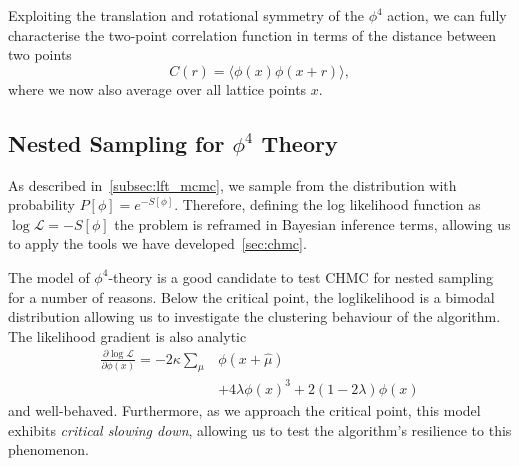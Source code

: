 \documentclass[11pt]{article}
\begin{document}
    Exploiting the translation and rotational symmetry of the $\phi^4$ action, we can fully characterise the two-point
    correlation function in terms of the distance between two points
    \begin{equation}\label{eq:correlation_function}
        C(r) = \langle \phi(x) \phi(x + r) \rangle,
    \end{equation}
    where we now also average over all lattice points $x$.

\subsection{Nested Sampling for $\phi^4$ Theory}\label{subsec:nested-sampling-phi4}
    As described in~\ref{subsec:lft_mcmc}, we sample from the distribution with probability $P[\phi] = e^{-S[\phi]}$.
    Therefore, defining the log likelihood function as $\log{\mathcal{L}} = -S[\phi]$ the problem is reframed in
    Bayesian inference terms, allowing us to apply the tools we have developed~\ref{sec:chmc}.

    The model of $\phi^4$-theory is a good candidate to test CHMC for nested sampling for a number of reasons.
    Below the critical point, the loglikelihood is a bimodal distribution allowing us to investigate the clustering
    behaviour of the algorithm.
    The likelihood gradient is also analytic
    \begin{equation}\label{eq:grad_likelihood}
    \begin{aligned}
        \frac{\partial \log{\mathcal{L}}} {\partial \phi(x)} = -2\kappa \sum\limits_{\mu} &\phi(x+\hat{\mu}) \\
        &+ 4\lambda \phi(x)^3 + 2(1-2\lambda)\phi(x)
    \end{aligned}
    \end{equation}
    and well-behaved.
    Furthermore, as we approach the critical point, this model exhibits \emph{critical slowing down}, allowing us to
    test the algorithm's resilience to this phenomenon.
\end{document}
